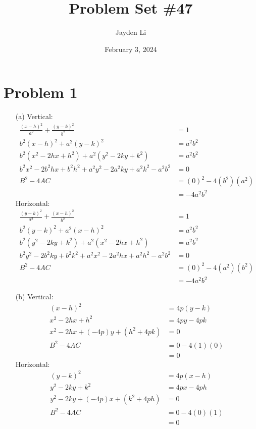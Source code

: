 \documentclass{article}
\title{Problem Set \#47}
\author{Jayden Li}
\date{February 3, 2024}
\begin{document}
\setlength{\abovedisplayskip}{0pt}
\fontsize{12pt}{12pt}\selectfont
\maketitle

\section*{Problem 1}
\begin{itemize}
\item[(a)]
	Vertical:
	\begin{align*}
		\frac{(x-h)^2}{a^2}+\frac{(y-k)^2}{b^2}&=1 \\
		b^2(x-h)^2+a^2(y-k)^2&=a^2b^2 \\
		b^2\left(x^2-2hx+h^2\right)+a^2\left(y^2-2ky+k^2\right)&=a^2b^2 \\
		b^2x^2-2b^2hx+b^2h^2+a^2y^2-2a^2ky+a^2k^2-a^2b^2&=0 \\
		B^2-4AC&=(0)^2-4\left(b^2\right)\left(a^2\right) \\
		&=\boxed{-4a^2b^2}
	\end{align*}
	Horizontal:
	\begin{align*}
		\frac{(y-k)^2}{a^2}+\frac{(x-h)^2}{b^2}&=1 \\
		b^2(y-k)^2+a^2(x-h)^2&=a^2b^2 \\
		b^2\left(y^2-2ky+k^2\right)+a^2\left(x^2-2hx+h^2\right)&=a^2b^2 \\
		b^2y^2-2b^2ky+b^2k^2+a^2x^2-2a^2hx+a^2h^2-a^2b^2&=0 \\
		B^2-4AC&=(0)^2-4\left(a^2\right)\left(b^2\right) \\
		&=\boxed{-4a^2b^2}
	\end{align*}

\item[(b)]
	Vertical:
	\begin{align*}
		(x-h)^2&=4p(y-k) \\
		x^2-2hx+h^2&=4py-4pk \\
		x^2-2hx+(-4p)y+\left(h^2+4pk\right)&=0 \\
		B^2-4AC&=0-4(1)(0) \\
		&=\boxed{0}
	\end{align*}
	Horizontal:
	\begin{align*}
		(y-k)^2&=4p(x-h) \\
		y^2-2ky+k^2&=4px-4ph \\
		y^2-2ky+(-4p)x+\left(k^2+4ph\right)&=0 \\
		B^2-4AC&=0-4(0)(1) \\
		&=\boxed{0}
	\end{align*}


\end{itemize}
\end{document}
